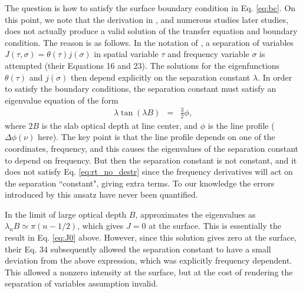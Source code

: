 \documentclass{aastex63}
\newcommand{\be}{\begin{eqnarray}}
\newcommand{\ee}{\end{eqnarray}}
\begin{document}
The question is how to satisfy the surface boundary condition in Eq. \ref{eq:bc}. On this point, we note that the derivation in \citet{1973MNRAS.162...43H}, and numerous studies later studies, does not actually produce a valid solution of the transfer equation and boundary condition. The reason is as follows. In the notation of \citet{1973MNRAS.162...43H}, a separation of variables
$J(\tau,\sigma) = \theta(\tau) j(\sigma)$ in spatial variable $\tau$ and frequency variable $\sigma$ is attempted (their Equations 16 and 23). The solutions for the eigenfunctions $\theta(\tau)$ and $j(\sigma)$ then depend explicitly on the separation constant $\lambda$. In order to satisfy the boundary conditions, the separation constant must satisfy an eigenvalue equation of the form
\be
\lambda \tan(\lambda B) & = & \frac{3}{2} \phi,
\label{eq:evalue}
\ee
where $2B$ is the slab optical depth at line center, and $\phi$ is the line profile ($\Delta \phi(\nu)$ here). The key point is that the line profile depends on one of the coordinates, frequency, and this causes the eigenvalues of the separation constant to depend on frequency. But then the separation constant is not constant, and it does not satisfy Eq. \ref{eq:rt_no_destr} since the frequency derivatives will act on the separation ``constant", giving extra terms. To our knowledge the errors introduced by this ansatz have never been quantified. 

In the limit of large optical depth $B$, \citealt{1973MNRAS.162...43H} approximates the eigenvalues as $\lambda_n B \simeq \pi (n-1/2)$, which gives $J=0$ at the surface. This is essentially the result in Eq. \ref{eq:J0} above. However, since this solution gives zero at the surface, their Eq. 34 subsequently allowed the separation constant to have a small deviation from the above expression, which was explicitly frequency dependent. This allowed a nonzero intensity at the surface, but at the cost of rendering the separation of variables assumption invalid. 

\end{document}

